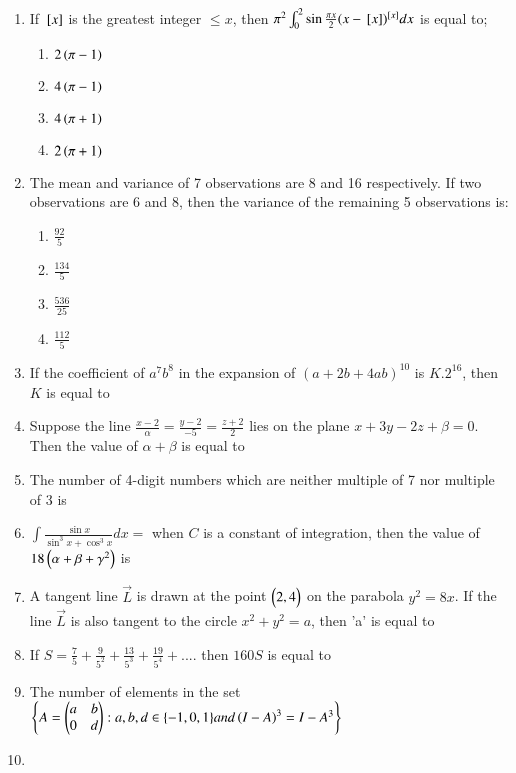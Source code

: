 \documentclass[journal]{IEEEtran}
\begin{document}
\begin{enumerate}
\begin{enumerate}
		\end{enumerate}
	\item 
	If ${}\left[x\right]$ is the greatest integer $\leq x$, then $\pi^{2}\int_{0}^{2} \sin{\frac{\pi x}{2}}(x-{}\left[x\right])^{{}\left[x\right]} dx$ is equal to;
		\begin{enumerate}
			\item $2\left(\pi-1\right)$
			\item $4\left(\pi-1\right)$
			\item $4\left(\pi+1\right)$
			\item $2\left(\pi+1\right)$
		\end{enumerate}
	\item 
	The mean and variance of 7 observations are 8 and 16 respectively. If two observations are 6 and 8, then the variance of the remaining 5 observations is:
		\begin{enumerate}
			\item $\frac{92}{5}$
			\item $\frac{134}{5}$
			\item $\frac{536}{25}$
			\item $\frac{112}{5}$
		\end{enumerate}
    \item 
    If the coefficient of $a^{7}b^{8}$ in the expansion of $(a + 2b + 4ab)^{10}$ is $K.2^{16}$, then $K$ is equal to
    \item
	Suppose the line $\frac{x-2}{\alpha} = \frac{y-2}{-5} = \frac{z+2}{2}$ lies on the plane  $x + 3y - 2z + \beta = 0$. Then the value of $\alpha + \beta$ is equal to 
	\item 
	The number of 4-digit numbers which are neither multiple of 7 nor multiple of 3 is 
	\item 
	$\int \frac{\sin{x}}{\sin^3{x} + \cos^3{x}} dx =$ when $C$ is a constant of integration, then the value of $18\left(\alpha+\beta+\gamma^{2}\right)$ is
	\item
	A tangent line $\vec{L}$ is drawn at the point $\begin{pmatrix}2 , 4\end{pmatrix}$ on the parabola $y^{2}= 8x$. If the line $\vec{L}$ is also tangent to the circle $x^2 + y^2 = a$, then 'a' is equal to
	\item 
	If $S=\frac{7}{5} + \frac{9}{5^{2}} + \frac{13}{5^{3}} + \frac{19}{5^{4}} + ....$ then $160S$ is equal to 
	\item 
	The number of elements in the set  \\
	$
	\left\{
	A = \begin{pmatrix}a & b \\ 0 & d\end{pmatrix}: a,b,d \in \{-1,0,1\} and \left(I-A\right)^{3} = I - A^{3}
	\right\}
	$
	\item 

\end{enumerate}
\end{document}
